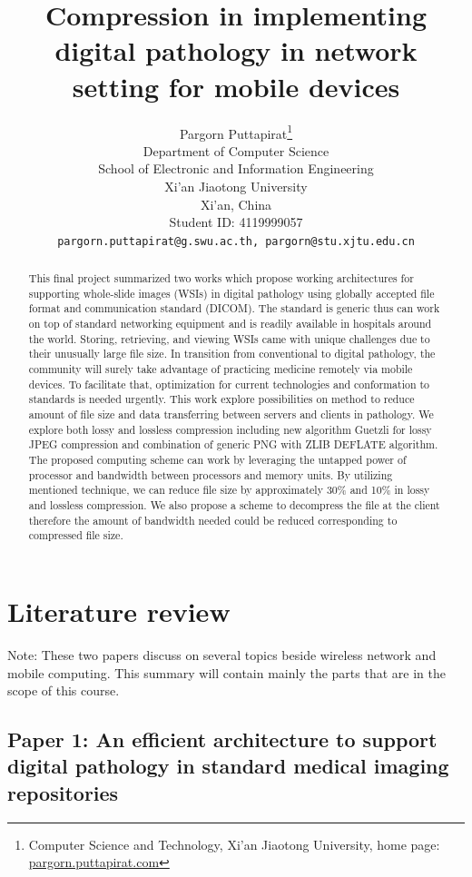 \documentclass{article}
\title{Compression in implementing digital pathology in network setting for mobile devices}
\author{
  Pargorn Puttapirat\thanks{Computer Science and Technology, Xi'an Jiaotong University, home page: \url{pargorn.puttapirat.com}} \\
  Department of Computer Science\\
  School of Electronic and Information Engineering\\
  Xi'an Jiaotong University\\
  Xi'an, China \\
  Student ID: 4119999057 \\
  \texttt{pargorn.puttapirat@g.swu.ac.th, pargorn@stu.xjtu.edu.cn} \\
}
\begin{document}
\maketitle

\begin{abstract}
This final project summarized two works which propose working architectures for supporting whole-slide images (WSIs) in digital pathology using globally accepted file format and communication standard (DICOM). The standard is generic thus can work on top of standard networking equipment and is readily available in hospitals around the world. Storing, retrieving, and viewing WSIs came with unique challenges due to their unusually large file size. In transition from conventional to digital pathology, the community will surely take advantage of practicing medicine remotely via mobile devices. To facilitate that, optimization for current technologies and conformation to standards is needed urgently. This work explore possibilities on method to reduce amount of file size and data transferring between servers and clients in pathology. We explore both lossy and lossless compression including new algorithm Guetzli for lossy JPEG compression and combination of generic PNG with ZLIB DEFLATE algorithm. The proposed computing scheme can work by leveraging the untapped power of processor and bandwidth between processors and memory units. By utilizing mentioned technique, we can reduce file size by approximately 30\% and 10\% in lossy and lossless compression. We also propose a scheme to decompress the file at the client therefore the amount of bandwidth needed could be reduced corresponding to compressed file size. 
\end{abstract}


\section{Literature review}
Note: These two papers discuss on several topics beside wireless network and mobile computing. This summary will contain mainly the parts that are in the scope of this course. 

\subsection{Paper 1: An efficient architecture to support digital pathology in standard medical imaging repositories}
\end{document}
